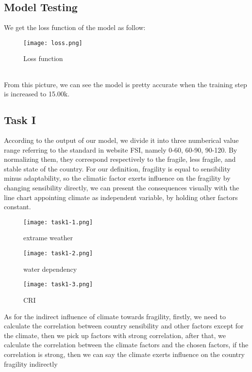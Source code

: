 \documentclass{mcmthesis}
\begin{document}
\subsection{Model Testing}
We get the loss function of the model as follow:\\
\begin{figure}[h]
\small
\centering
\texttt{[image: loss.png]}
\caption{Loss function} 
\label{fig:lf}
\end{figure}\\
From this picture, we can see the model is pretty accurate when 
the training step is increased to 15.00k.
\subsection{Task I}
According to the output of our model, we divide it into 
three numberical value range referring to the standard in website 
FSI, namely 0-60, 60-90, 90-120. By normalizing them, they 
correspond respectively to the fragile, less fragile, and stable 
state of the country. For our definition, fragility is equal to 
sensibility minus adaptability, so the climatic factor exerts 
influence on the fragility by changing sensibility directly, 
we can present the consequences visually with the line chart 
appointing climate as independent variable, by holding other 
factors constant. 
\begin{figure}[h]
  \centering
  \begin{minipage}[h]{0.3\textwidth}
  \centering
  \texttt{[image: task1-1.png]}
  \caption{extrame weather}
  \end{minipage}
  \begin{minipage}[h]{0.3\textwidth}
  \centering
  \texttt{[image: task1-2.png]}
  \caption{water dependency}
  \end{minipage}    
  \begin{minipage}[h]{0.3\textwidth}
  \centering
  \texttt{[image: task1-3.png]}
  \caption{CRI}
  \end{minipage}  
\end{figure}
As for the indirect influence of climate towards 
fragility, firstly, we need to calculate the correlation between 
country sensibility and other factors except for the climate, then 
we pick up factors with strong correlation, after that, we 
calculate the correlation between the climate factors and the 
chosen factors, if the correlation is strong, then we can say 
the climate exerts influence on the country fragility indirectly 
\end{document}
